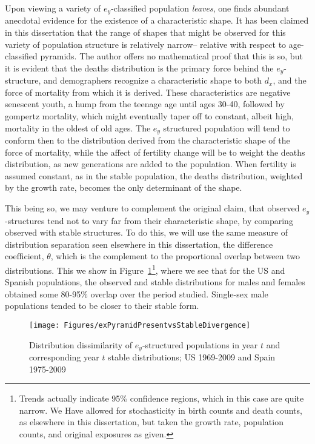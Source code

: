  \FloatBarrier
Upon viewing a variety of $e_y$-classified population \textit{leaves}, one finds
abundant anecdotal evidence for the existence of a characteristic shape. It has
been claimed in this dissertation that the range of shapes that might be
observed for this variety of population structure is relatively narrow--
relative with respect to age-classified pyramids. The author offers no
mathematical proof that this is so, but it is evident that the deaths
distribution is the primary force behind the $e_y$-structure, and demographers
recognize a characteristic shape to both $d_x$, and the force of mortality from
which it is derived. These characteristics are negative senescent youth, a hump
from the teenage age until ages 30-40, followed by gompertz mortality, which
might eventually taper off to constant, albeit high, mortality in the oldest of
old ages. The $e_y$ structured population will tend to conform then to the
distribution derived from the characteristic shape of the force of mortality,
while the affect of fertility change will be to weight the deaths distribution,
as new generations are added to the population. When fertility is assumed
constant, as in the stable population, the deaths distribution, weighted by 
the growth rate, becomes the only determinant of the shape. 

This being so, we may venture to complement the original claim, that observed
$e_y$-structures tend not to vary far from their characteristic shape, by
comparing observed with stable structures. To do this, we will use the same 
measure of distribution separation seen elsewhere in this dissertation, the
difference coefficient, $\theta$, which is the complement to the proportional
overlap between two distributions. This we show in
Figure~\ref{fig:exstablepyr}\footnote{Trends actually indicate 95\% confidence
regions, which in this case are quite narrow. We Have allowed for
stochasticity in birth counts and death counts, as elsewhere in this
dissertation, but taken the growth rate, population counts, and original
exposures as given.}, where we see that for the US and Spanish populations, the
observed and stable distributions for males and females obtained some 80-95\%
overlap over the period studied. Single-sex male populations tended to be closer
to their stable form.

\begin{figure}
       \centering
       \caption{Distribution dissimilarity of $e_y$-structured populations in
       year $t$ and corresponding year $t$ stable distributions; US 1969-2009
       and Spain 1975-2009}
        \texttt{[image: Figures/exPyramidPresentvsStableDivergence]}
        \label{fig:exstablepyr}
\end{figure}

